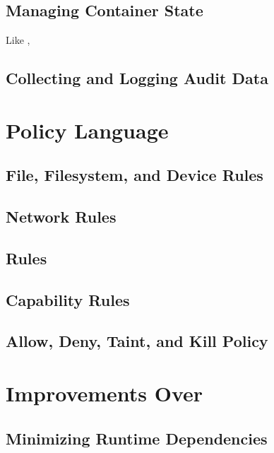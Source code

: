 \subsection{Managing Container State}%
\label{ss:bpfcontain-state}

Like \bpfbox{},

\subsection{Collecting and Logging Audit Data}%
\label{ss:bpfcontain-audit}




\section{\bpfcontain{} Policy Language}%
\label{s:bpfcontain-policy}


\subsection{File, Filesystem, and Device Rules}

\subsection{Network Rules}

\subsection{ Rules}

\subsection{Capability Rules}

\subsection{Allow, Deny, Taint, and Kill Policy}




\section{Improvements Over \bpfbox{}}%
\label{s:bpfcontain-improvements}

\subsection{Minimizing Runtime Dependencies}%
\label{ss:bpfcontain-minimizing}

